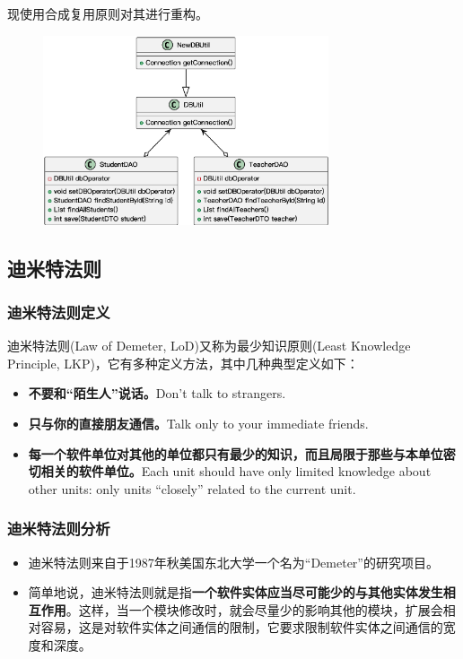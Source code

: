 现使用合成复用原则对其进行重构。
\begin{figure}[H]
    \vspace{-0.5em}
	\centering
	\includegraphics[width=0.75\textwidth]{images/合成复用原则实例2.eps}
    \vspace{-1em}
\end{figure}

\subsection{迪米特法则}

\subsubsection{迪米特法则定义}
迪米特法则(Law of Demeter, LoD)又称为最少知识原则(Least Knowledge Principle, LKP)，它有多种定义方法，其中几种典型定义如下：
\begin{itemize}
    \item \textbf{不要和“陌生人”说话。}Don't talk to strangers.
    \item \textbf{只与你的直接朋友通信。}Talk only to your immediate friends.
    \item \textbf{每一个软件单位对其他的单位都只有最少的知识，而且局限于那些与本单位密切相关的软件单位。}Each unit should have only limited knowledge about other units: only units ``closely'' related to the current unit.
\end{itemize}

\subsubsection{迪米特法则分析}
\begin{itemize}
    \item 迪米特法则来自于1987年秋美国东北大学一个名为``Demeter''的研究项目。
    \item 简单地说，迪米特法则就是指\textbf{一个软件实体应当尽可能少的与其他实体发生相互作用}。这样，当一个模块修改时，就会尽量少的影响其他的模块，扩展会相对容易，这是对软件实体之间通信的限制，它要求限制软件实体之间通信的宽度和深度。
\end{itemize}

